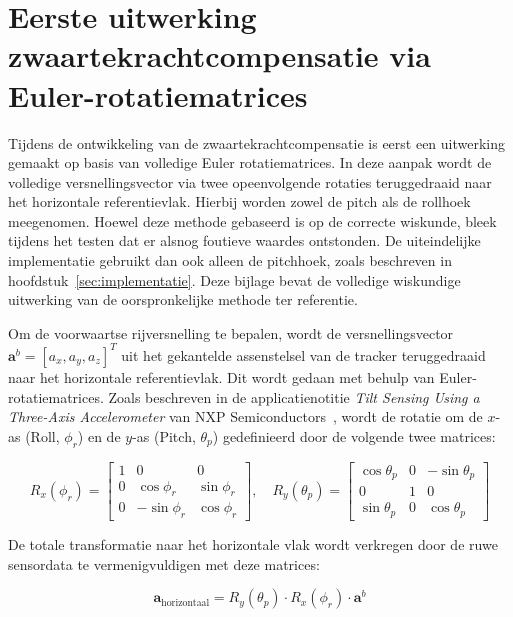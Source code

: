 \section{Eerste uitwerking zwaartekrachtcompensatie via Euler-rotatiematrices}
\label{app:zwaartekracht}

Tijdens de ontwikkeling van de zwaartekrachtcompensatie is eerst een 
uitwerking gemaakt op basis van volledige Euler rotatiematrices. In deze 
aanpak wordt de volledige versnellingsvector via twee opeenvolgende 
rotaties teruggedraaid naar het horizontale referentievlak. Hierbij worden zowel 
de pitch als de rollhoek meegenomen. Hoewel deze methode gebaseerd is op de correcte wiskunde, bleek tijdens het testen dat er alsnog foutieve waardes ontstonden. De uiteindelijke implementatie gebruikt dan ook alleen de pitchhoek, zoals beschreven in hoofdstuk~\ref{sec:implementatie}. Deze bijlage bevat 
de volledige wiskundige uitwerking van de oorspronkelijke methode ter 
referentie.

Om de voorwaartse rijversnelling te bepalen, wordt de versnellingsvector 
$\mathbf{a}^b = [a_x, a_y, a_z]^T$ uit het gekantelde assenstelsel van 
de tracker teruggedraaid naar het horizontale referentievlak. Dit wordt 
gedaan met behulp van Euler-rotatiematrices. Zoals beschreven in de 
applicatienotitie \textit{Tilt Sensing Using a Three-Axis Accelerometer} 
van NXP Semiconductors~\cite{nxp2013}, wordt de rotatie om de $x$-as 
(Roll, $\phi_r$) en de $y$-as (Pitch, $\theta_p$) gedefinieerd door de 
volgende twee matrices:

\begin{equation}
R_x(\phi_r) = \begin{bmatrix} 
1 & 0 & 0 \\ 
0 & \cos\phi_r & \sin\phi_r \\ 
0 & -\sin\phi_r & \cos\phi_r 
\end{bmatrix}, \quad
R_y(\theta_p) = \begin{bmatrix} 
\cos\theta_p & 0 & -\sin\theta_p \\ 
0 & 1 & 0 \\ 
\sin\theta_p & 0 & \cos\theta_p 
\end{bmatrix}
\end{equation}

De totale transformatie naar het horizontale vlak wordt verkregen door 
de ruwe sensordata te vermenigvuldigen met deze matrices:

\begin{equation}
    \mathbf{a}_{\text{horizontaal}} = R_y(\theta_p) \cdot R_x(\phi_r) 
    \cdot \mathbf{a}^b
    \label{eq:horizontaal_bijlage}
\end{equation}

